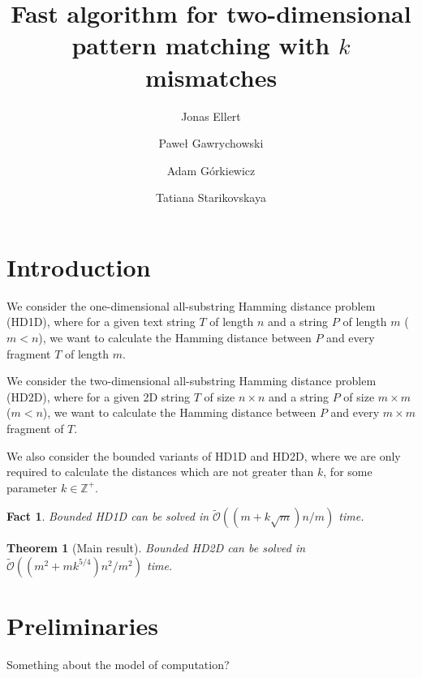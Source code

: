 \documentclass[11pt]{article}
\title{Fast algorithm for two-dimensional pattern matching with $k$ mismatches}
\author[1]{Jonas Ellert}
\author[2]{Paweł Gawrychowski}
\author[3]{Adam Górkiewicz}
\author[4]{Tatiana Starikovskaya}
\affil[1]{?}
\affil[2]{?}
\affil[3]{?}
\affil[4]{?}
\newcommand{\Z}{\mathbb{Z}}
\newcommand{\tO}{\tilde{\mathcal{O}}}
\theoremstyle{plain}
\newtheorem{theorem}{Theorem}
\newtheorem{fact}{Fact}
\theoremstyle{definition}
\theoremstyle{remark}
\begin{document}
\date{}
\maketitle

\begin{abstract}
\end{abstract}



\section{Introduction}

\newcommand{\hd}{\textsc{HD1D}\xspace}
\newcommand{\HD}{\textsc{HD2D}\xspace}

We consider the one-dimensional all-substring Hamming distance problem (\hd), where for a given text string $T$ of length $n$ and a string $P$ of length $m$ ($m < n$), we want to calculate the Hamming distance between $P$ and every fragment $T$ of length $m$.

We consider the two-dimensional all-substring Hamming distance problem (\HD), where for a given 2D string $T$ of size $n \times n$ and a string $P$ of size $m \times m$ ($m < n$), we want to calculate the Hamming distance between $P$ and every $m \times m$ fragment of $T$.

We also consider the bounded variants of \hd and \HD, where we are only required to calculate the distances which are not greater than $k$, for some parameter $k \in \Z^+$.


\begin{fact}
	Bounded \hd can be solved in $\tO((m + k \sqrt{m})n / m)$ time.
\end{fact}


\begin{theorem}[Main result]\label{main result}
	Bounded \HD can be solved in $\tO((m^2 + mk^{5/4})n^2 / m^2)$ time.
\end{theorem}


\section{Preliminaries}

Something about the model of computation?
\end{document}
